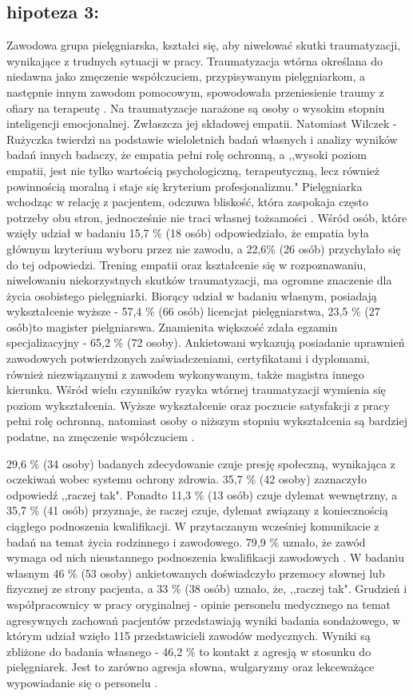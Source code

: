 \documentclass[a4paper,12pt,twoside,openany]{report}
\begin{document}
\subsection{hipoteza 3:} 
Zawodowa grupa pielęgniarska, kształci się, aby niwelować skutki traumatyzacji, wynikające z trudnych sytuacji w pracy. Traumatyzacja wtórna określana do niedawna jako zmęczenie współczuciem, przypisywanym pielęgniarkom, a następnie innym zawodom pomocowym, spowodowała przeniesienie traumy z ofiary na terapeutę \cite{figley}. Na traumatyzacje narażone są osoby o wysokim stopniu inteligencji emocjonalnej. Zwłaszcza jej składowej empatii. Natomiast Wilczek - Rużyczka twierdzi na podstawie wieloletnich badań własnych i analizy wyników badań innych badaczy, że empatia pełni rolę ochronną, a ,,wysoki poziom empatii, jest nie tylko wartością psychologiczną, terapeutyczną, lecz również powinnością moralną i staje się kryterium profesjonalizmu."  Pielęgniarka wchodząc w relację z pacjentem, odczuwa bliskość, która zaspokaja często potrzeby obu stron, jednocześnie nie traci własnej tożsamości \cite{wilczek}. Wśród osób, które wzięły udział w badaniu  15,7 \% (18 osób) odpowiedziało, że empatia była głównym kryterium wyboru przez nie zawodu, a 22,6\% (26 osób) przychylało się do tej odpowiedzi. Trening empatii oraz kształcenie się w  rozpoznawaniu, niwelowaniu niekorzystnych skutków traumatyzacji,  ma ogromne znaczenie dla życia osobistego pielęgniarki. Biorący udział w badaniu własnym,  posiadają wykształcenie wyższe - 57,4 \% (66 osób) licencjat pielęgniarstwa,  23,5 \% (27 osób)to magister pielgniarswa. Znamienita większość zdała egzamin specjalizacyjny - 65,2 \% (72 osoby). Ankietowani wykazują posiadanie uprawnień zawodowych potwierdzonych zaświadczeniami, certyfikatami i dyplomami, również niezwiązanymi z zawodem wykonywanym, także magistra innego kierunku. Wśród wielu czynników ryzyka wtórnej traumatyzacji wymienia się poziom wykształcenia. Wyższe wykształcenie oraz poczucie satysfakcji z pracy pełni rolę ochronną, natomiast osoby o niższym stopniu wykształcenia są bardziej podatne, na zmęczenie współczuciem \cite{ogińska}.


29,6 \% (34 osoby) badanych zdecydowanie czuje presję społeczną, wynikająca z oczekiwań wobec systemu ochrony zdrowia. 35,7 \% (42 osoby) zaznaczyło odpowiedź ,,raczej tak". Ponadto 11,3 \% (13 osób)  czuje dylemat wewnętrzny, a 35,7 \%  (41 osób) przyznaje, że raczej czuje, dylemat związany z koniecznością ciągłego podnoszenia kwalifikacji. W przytaczanym wcześniej komunikacie z badań na temat życia rodzinnego i zawodowego. 79,9 \% uznało, że zawód wymaga od nich nieustannego podnoszenia kwalifikacji zawodowych \cite{komunikat}. W badaniu własnym 46 \% (53 osoby) ankietowanych doświadczyło przemocy słownej lub fizycznej ze strony pacjenta, a 33 \% (38 osób) uznało, że, ,,raczej tak".  Grudzień i współpracownicy w pracy oryginalnej - opinie personelu medycznego na temat agresywnych zachowań pacjentów przedstawiają wyniki badania sondażowego, w którym udział wzięło 115 przedstawicieli zawodów medycznych. Wyniki są zbliżone do badania własnego - 46,2 \% to kontakt z agresją w stosunku do pielęgniarek. Jest to zarówno agresja słowna, wulgaryzmy oraz lekceważące wypowiadanie się o personelu \cite{grudzień}. 
\end{document}
